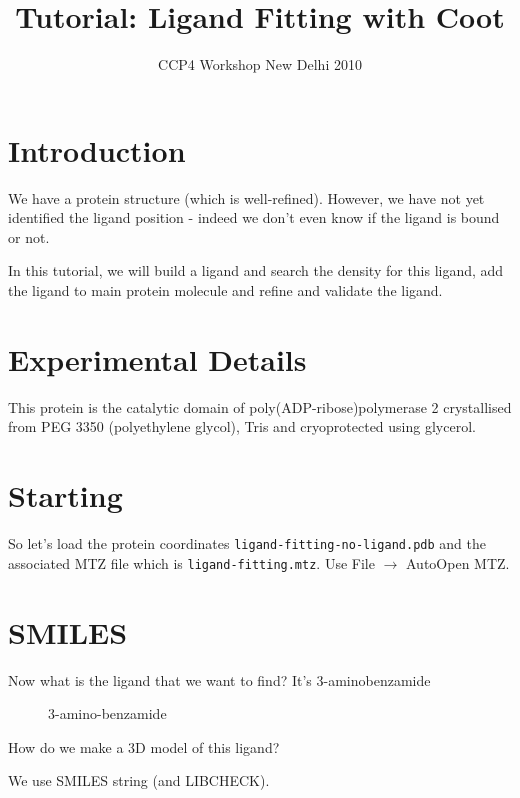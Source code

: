 \documentclass{article}
\title{Tutorial: Ligand Fitting with Coot}
\author{CCP4 Workshop New Delhi 2010}
\begin{document}
\maketitle
 

\section{Introduction}

We have a protein structure (which is well-refined). However, we have
not yet identified the ligand position - indeed we don't even know if
the ligand is bound or not.  

In this tutorial, we will build a ligand
and search the density for this ligand, add the ligand to main protein
molecule and refine and validate the ligand.

\section{Experimental Details}

 This protein is the catalytic domain of poly(ADP-ribose)polymerase 2
 crystallised from PEG 3350 (polyethylene glycol), Tris and
 cryoprotected using glycerol.

\section{Starting}
 So let's load the protein coordinates
 \texttt{ligand-fitting-no-ligand.pdb} and the associated MTZ file
 which is \texttt{ligand-fitting.mtz}.  Use \textsf{File $\rightarrow$ AutoOpen MTZ}.

\section{SMILES}

 Now what is the ligand that we want to find? It's 3-aminobenzamide

\begin{figure}[htbp]
  \begin{center}
    \leavevmode
    \epsfxsize 30mm
    \caption{3-amino-benzamide}{}
    \label{fig:3-amino-benzamide}
  \end{center}
\end{figure}

\begin{trivlist}
\item  How do we make a 3D model of this ligand?

\textsf{We use SMILES string (and LIBCHECK).}
\end{trivlist}
\end{document}
